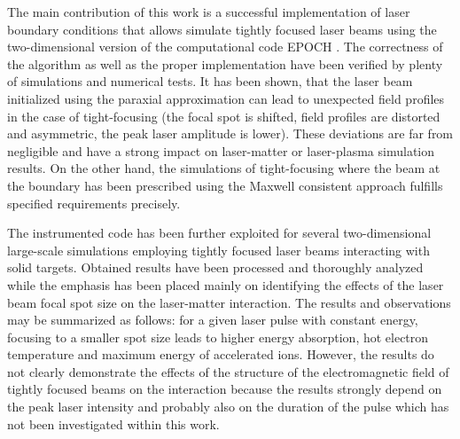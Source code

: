 The main contribution of this work is a successful implementation of laser boundary conditions that allows simulate tightly focused laser beams using the two-dimensional version of the computational code EPOCH \cite{bennett}. The correctness of the algorithm as well as the proper implementation have been verified by plenty of simulations and numerical tests. It has been shown, that the laser beam initialized using the paraxial approximation can lead to unexpected field profiles in the case of tight-focusing (the focal spot is shifted, field profiles are distorted and asymmetric, the peak laser amplitude is lower). These deviations are far from negligible and have a strong impact on laser-matter or laser-plasma simulation results. On the other hand, the simulations of tight-focusing where the beam at the boundary has been prescribed using the Maxwell consistent approach \cite{Thiele2016} fulfills specified requirements precisely.

The instrumented code has been further exploited for several two-dimensional large-scale simulations employing tightly focused laser beams interacting with solid targets. Obtained results have been processed and thoroughly analyzed while the emphasis has been placed mainly on identifying the effects of the laser beam focal spot size on the laser-matter interaction. The results and observations may be summarized as follows: for a given laser pulse with constant energy, focusing to a smaller spot size leads to higher energy absorption, hot electron temperature and maximum energy of accelerated ions. However, the results do not clearly demonstrate the effects of the structure of the electromagnetic field of tightly focused beams on the interaction because the results strongly depend on the peak laser intensity and probably also on the duration of the pulse which has not been investigated within this work. 

